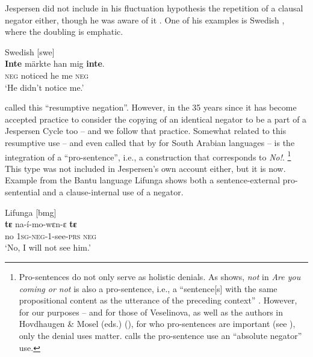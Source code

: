 ﻿\documentclass[output=paper]{langsci/langscibook}
\begin{document}
%
Jespersen did not
include in his fluctuation hypothesis the repetition of a clausal negator
either, though he was aware of it \parencite[72--73]{Jespersen1917}.
One of his examples is Swedish ,
where the doubling is emphatic.
%
\begin{exe}\ex\label{ex:int-swedish-notice}
    Swedish [swe]   \\
    \gll \textbf{Inte}   märkte  han   mig   \textbf{inte}.  \\
  \textsc{neg}  noticed  he  me  \textsc{neg} \\
    \glt `He didn't notice me.'
    \end{exe}
%
\textcite[72]{Jespersen1917} called this ``resumptive negation''. However, in
the 35 years since \textcite{Dahl1979} it has become accepted practice to
consider the copying of an identical negator to be a part of a Jespersen
Cycle too -- and we follow that practice. Somewhat related to this
resumptive use -- and even called that by
\textcites[359]{Sjors2015}[399]{Sjors2018} for
South Arabian languages -- is the integration of a ``pro-sentence'', i.e., a
construction that corresponds to \textit{No!}.%
%
\footnote{Pro-sentences do
not only serve as holistic denials. As \textcite[111]{Veselinova2013} shows,
\textit{not} in \textit{Are you coming or
not} is also a pro-sentence, i.e., a ``sentence[s] with the same
propositional content as the utterance of the preceding context''
\parencite[89]{BerniniRamat1996}. However, for our purposes -- and for those
of Veselinova, as well as the authors in Hovdhaugen \& Mosel (eds.)
(\citeyear{HovdhaugenMosel1999}), for who pro-sentences are important (see
), only the
denial uses matter. \textcite[30]{Schwegler1988} calls the pro-sentence use an
``absolute negator'' use.} %
%
This type was not included in Jespersen's own
account either, but it is now. Example  from the
Bantu language Lifunga shows both a sentence-external
pro-sentential and a clause-internal use of a negator.
%
\begin{exe}\ex\label{ex:int-lifunga-see}
Lifunga [bmg]
\\
    \gll \textbf{tɛ}  na-í-mo-wɛn-ɛ   \textbf{tɛ}\\
  no  \textsc{1sg-neg}-1-see-\textsc{prs}   \textsc{neg} \\
    \glt `No, I will not see him.'
    \end{exe}
\end{document}
